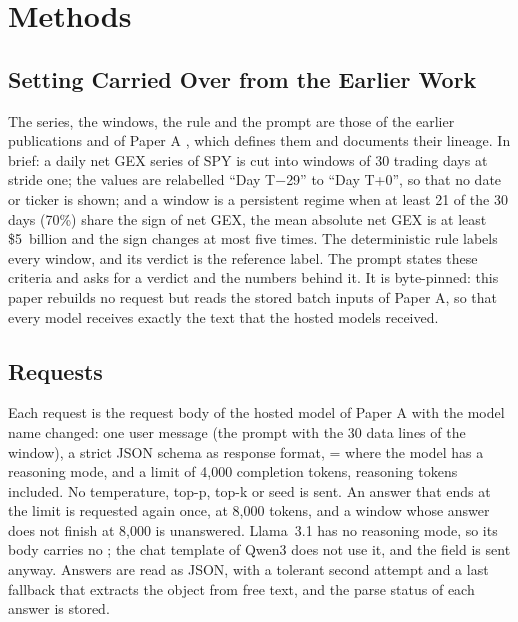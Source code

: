 \section{Methods}
\label{sec:methods}

\subsection{Setting Carried Over from the Earlier Work}
\label{sec:methods:setting}

The series, the windows, the rule and the prompt are those of the earlier publications \cite{regan2025obfuscation,regan2026regimes,regan2026jrfm} and of Paper A \cite{regan2026rerun}, which defines them and documents their lineage. In brief: a daily net GEX series of SPY is cut into windows of 30 trading days at stride one; the values are relabelled ``Day T$-$29'' to ``Day T+0'', so that no date or ticker is shown; and a window is a persistent regime when at least 21 of the 30 days (70\%) share the sign of net GEX, the mean absolute net GEX is at least \$5~billion and the sign changes at most five times. The deterministic rule labels every window, and its verdict is the reference label. The prompt states these criteria and asks for a verdict and the numbers behind it. It is byte-pinned: this paper rebuilds no request but reads the stored batch inputs of Paper A, so that every model receives exactly the text that the hosted models received.

\subsection{Requests}
\label{sec:methods:requests}

Each request is the request body of the hosted model of Paper A with the model name changed: one user message (the prompt with the 30 data lines of the window), a strict JSON schema as response format,  =  where the model has a reasoning mode, and a limit of 4{,}000 completion tokens, reasoning tokens included. No temperature, top-p, top-k or seed is sent. An answer that ends at the limit is requested again once, at 8{,}000 tokens, and a window whose answer does not finish at 8{,}000 is unanswered. Llama~3.1 has no reasoning mode, so its body carries no ; the chat template of Qwen3 does not use it, and the field is sent anyway. Answers are read as JSON, with a tolerant second attempt and a last fallback that extracts the object from free text, and the parse status of each answer is stored.

